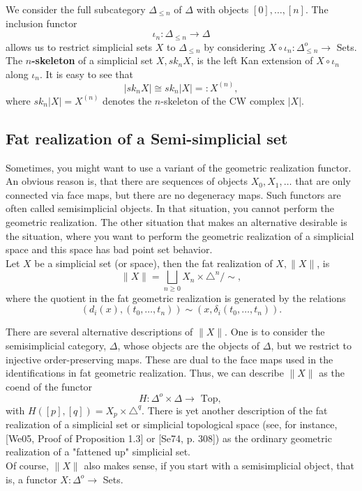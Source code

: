 We consider the full subcategory $\Delta_{\leq n}$ of $\Delta$ with objects $[0], \ldots,[n]$. The inclusion functor
$$
\iota_n: \Delta_{\leq n} \rightarrow \Delta
$$
allows us to restrict simplicial sets $X$ to $\Delta_{\leq n}$ by considering $X \circ \iota_n: \Delta_{\leq n}^o \rightarrow$ Sets.
The \textbf{$n$-skeleton} of a simplicial set $X, s k_n X$, is the left Kan extension of $X \circ \iota_n$ along $\iota_n$.
It is easy to see that 
$$
\left|s k_n X\right| \cong s k_n|X|=: X^{(n)},
$$
where $s k_n|X|=X^{(n)}$ denotes the $n$-skeleton of the CW complex $|X|$.

\subsection*{Fat realization of a Semi-simplicial set}

Sometimes, you might want to use a variant of the geometric realization functor. An obvious reason is, that there are sequences of objects $X_0, X_1, \ldots$ that are only connected via face maps, but there are no degeneracy maps. Such functors are often called semisimplicial objects. In that situation, you cannot perform the geometric realization. The other situation that makes an alternative desirable is the situation, where you want to perform the geometric realization of a simplicial space and this space has bad point set behavior.\\

Let $X$ be a simplicial set (or space), then the fat realization of $X,\|X\|$, is
$$
\|X\|=\bigsqcup_{n \geq 0} X_n \times \triangle^n / \sim,
$$
where the quotient in the fat geometric realization is generated by the relations
$$
\left(d_i(x),\left(t_0, \ldots, t_n\right)\right) \sim\left(x, \delta_i\left(t_0, \ldots, t_n\right)\right) .
$$

There are several alternative descriptions of $\|X\|$. One is to consider the semisimplicial category, $\Delta$, whose objects are the objects of $\Delta$, but we restrict to injective order-preserving maps. These are dual to the face maps used in the identifications in fat geometric realization. Thus, we can describe $\|X\|$ as the coend of the functor
$$
H: \Delta^o \times \Delta \rightarrow \text { Top, }
$$
with $H([p],[q])=X_p \times \triangle^q$.
There is yet another description of the fat realization of a simplicial set or simplicial topological space (see, for instance, [We05, Proof of Proposition 1.3] or [Se74, p. 308]) as the ordinary geometric realization of a "fattened up" simplicial set.\\
Of course, $\|X\|$ also makes sense, if you start with a semisimplicial object, that is, a functor $X: \Delta^o \rightarrow$ Sets.

